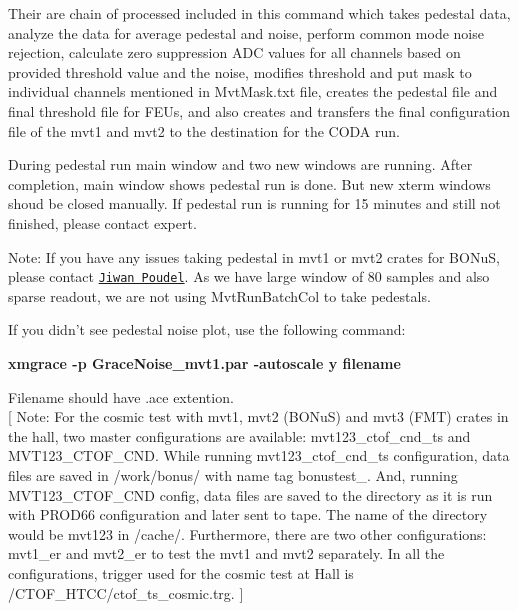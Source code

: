 Their are chain of processed included in this command which takes pedestal data, analyze the data for average pedestal and noise, perform common mode noise rejection, calculate zero suppression ADC values for all channels based on provided threshold value and the noise, modifies threshold and put mask to individual channels mentioned in MvtMask.txt file, creates the pedestal file and final threshold file for FEUs, and also creates and transfers the final configuration file of the mvt1 and mvt2 to the destination for the CODA run.

During pedestal run main window and two new windows are running. After completion, main window shows pedestal run is done. But new xterm windows shoud be closed manually. If pedestal run is running for 15 minutes and still not finished, please contact expert.

{\color{red}Note:} If you have any issues taking pedestal in mvt1 or mvt2 crates for BONuS, please contact \href{mailto:jpoud001@odu.edu}{\color{blue}\nolinkurl{Jiwan Poudel}}. As we have large window of 80 samples and also sparse readout, we are not using MvtRunBatchCol to take pedestals.

If you didn't see pedestal noise plot, use the following command:

\begin{center}
	\centering \textbf{xmgrace -p GraceNoise\_mvt1.par -autoscale y  filename}
\end{center}

Filename should have .ace extention.\\


{\large[}{\color{red} Note:} For the cosmic test with mvt1, mvt2 (BONuS) and mvt3 (FMT) crates in the hall, two master configurations are available: mvt123\_ctof\_cnd\_ts and MVT123\_CTOF\_CND. While running mvt123\_ctof\_cnd\_ts configuration, data files are saved in /work/bonus/ with name tag bonustest\_. And, running MVT123\_CTOF\_CND config, data files are saved to the directory as it is run with PROD66 configuration and later sent to tape. The name of the directory would be mvt123 in /cache/. Furthermore, there are two other configurations: mvt1\_er and mvt2\_er to test the mvt1 and mvt2 separately. In all the configurations, trigger used for the cosmic test at Hall is /CTOF\_HTCC/ctof\_ts\_cosmic.trg. {\large]}
